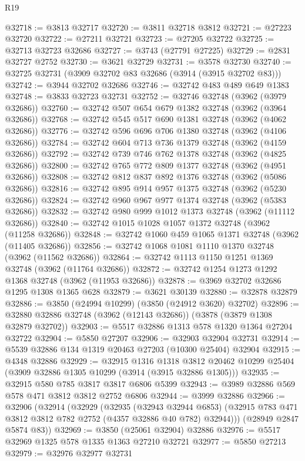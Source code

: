 \begin{lexlean}{R19}
\begin{coremodule}
@32718 := @3813 @32717
@32720 := @3811 @32718 @3812
@32721 := @27223 @32720
@32722 := @27211 @32721
@32723 := @27205 @32722
@32725 := @32713 @32723 @32686
@32727 := @3743 (@27791 @27225)
@32729 := @2831 @32727 @2752
@32730 := @3621 @32729
@32731 := @3578 @32730
@32740 := @32725 @32731 (@3909 @32702 @83 @32686 (@3914 (@3915 @32702 @83)))
@32742 := @3944 @32702 @32686
@32746 := @32742 @483 @489 @649 @1383
@32748 := @3833 @32723 @32731
@32752 := @32746 @32748 (@3962 (@3979 @32686))
@32760 := @32742 @507 @654 @679 @1382 @32748 (@3962 (@3964 @32686))
@32768 := @32742 @545 @517 @690 @1381 @32748 (@3962 (@4062 @32686))
@32776 := @32742 @596 @696 @706 @1380 @32748 (@3962 (@4106 @32686))
@32784 := @32742 @604 @713 @736 @1379 @32748 (@3962 (@4159 @32686))
@32792 := @32742 @739 @746 @762 @1378 @32748 (@3962 (@4825 @32686))
@32800 := @32742 @765 @772 @809 @1377 @32748 (@3962 (@4951 @32686))
@32808 := @32742 @812 @837 @892 @1376 @32748 (@3962 (@5086 @32686))
@32816 := @32742 @895 @914 @957 @1375 @32748 (@3962 (@5230 @32686))
@32824 := @32742 @960 @967 @977 @1374 @32748 (@3962 (@5383 @32686))
@32832 := @32742 @980 @999 @1012 @1373 @32748 (@3962 (@11112 @32686))
@32840 := @32742 @1015 @1028 @1057 @1372 @32748 (@3962 (@11258 @32686))
@32848 := @32742 @1060 @459 @1065 @1371 @32748 (@3962 (@11405 @32686))
@32856 := @32742 @1068 @1081 @1110 @1370 @32748 (@3962 (@11562 @32686))
@32864 := @32742 @1113 @1150 @1251 @1369 @32748 (@3962 (@11764 @32686))
@32872 := @32742 @1254 @1273 @1292 @1368 @32748 (@3962 (@11953 @32686))
@32878 := @3969 @32702 @32686 @1295 @1308 @1365 @628
@32879 := @3621 @30139
@32880 := @32878 @32879
@32886 := @3850 (@24994 @10299) (@3850 (@24912 @3620) @32702)
@32896 := @32880 @32886 @32748 (@3962 (@12143 @32686)) (@3878 (@3879 @1308 @32879 @32702))
@32903 := @5517 @32886 @1313 @578 @1320 @1364 @27204 @32722
@32904 := @5850 @27207
@32906 := @32903 @32904 @32731
@32914 := @5539 @32886 @134 @1319 @20463 @27203 (@10300 @25404) @32904
@32915 := @4348 @32886
@32929 := @32915
    @1316
    @1318
    @3812
    @20462
    @10299
    @25404
    (@3909 @32886 @1305 @10299 (@3914 (@3915 @32886 @1305)))
@32935 := @32915 @580 @785 @3817 @3817 @6806 @5399
@32943 := @3989 @32886 @569 @578 @471 @3812 @3812 @2752 @6806
@32944 := @3999 @32886
@32966 := @32906
    (@32914
      (@32929
        (@32935
          (@32943 @32944 @6853)
          (@32915 @783 @471 @3812 @3812 @782 @2752 (@4357 @32886 @40 @782) @32944)))
      (@28949 @2847 @5874 @83))
@32969 := @3850 (@25061 @32904) @32886
@32976 := @5517 @32969 @1325 @578 @1335 @1363 @27210 @32721
@32977 := @5850 @27213
@32979 := @32976 @32977 @32731

\end{coremodule}
\end{lexlean}
